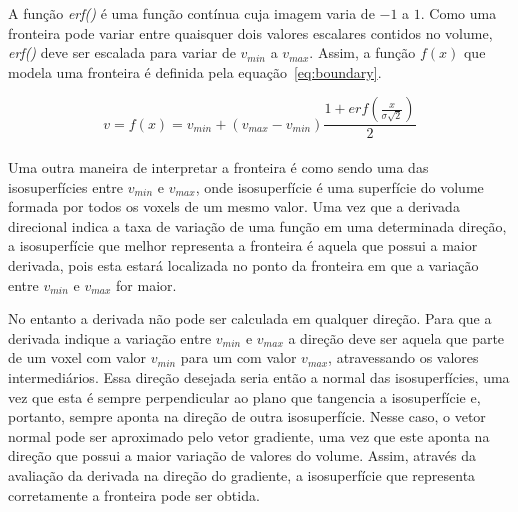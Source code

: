 	A função \textit{erf()} é uma função contínua cuja imagem varia de $-1$ a $1$. Como uma fronteira pode variar entre quaisquer dois valores escalares contidos no volume, \textit{erf()} deve ser escalada para variar de $v_{min}$ a $v_{max}$. Assim, a função $f(x)$ que modela uma fronteira é definida pela equação~\eqref{eq:boundary}.

\begin{equation} \label{eq:boundary}
	v = f(x) = v_{min} + (v_{max} - v_{min}) \frac{1 + erf(\frac{x}{\sigma\sqrt{2}})}{2}
\end{equation} \\

	Uma outra maneira de interpretar a fronteira é como sendo uma das isosuperfícies entre $v_{min}$ e $v_{max}$, onde isosuperfície é uma superfície do volume formada por todos os voxels de um mesmo valor. Uma vez que a derivada direcional indica a taxa de variação de uma função em uma determinada direção, a isosuperfície que melhor representa a fronteira é aquela que possui a maior derivada, pois esta estará localizada no ponto da fronteira em que a variação entre $v_{min}$ e $v_{max}$ for maior.
	
	No entanto a derivada não pode ser calculada em qualquer direção. Para que a derivada indique a variação entre $v_{min}$ e $v_{max}$ a direção deve ser aquela que parte de um voxel com valor $v_{min}$ para um com valor $v_{max}$, atravessando os valores intermediários. Essa direção desejada seria então a normal das isosuperfícies, uma vez que esta é sempre perpendicular ao plano que tangencia a isosuperfície e, portanto, sempre aponta na direção de outra isosuperfície. Nesse caso, o vetor normal pode ser aproximado pelo vetor gradiente, uma vez que este aponta na direção que possui a maior variação de valores do volume. Assim, através da avaliação da derivada na direção do gradiente, a isosuperfície que representa corretamente a fronteira pode ser obtida.
	
	
